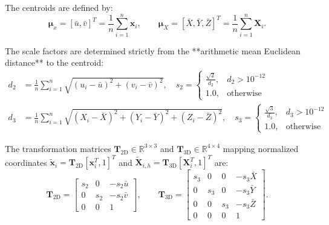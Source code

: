 \documentclass[journal]{IEEEtran}
\begin{document}
The centroids are defined by:
\begin{equation}
\boldsymbol{\mu}_x = [\bar{u}, \bar{v}]^T = \frac{1}{n} \sum_{i=1}^n \mathbf{x}_i, \qquad \boldsymbol{\mu}_X = [\bar{X}, \bar{Y}, \bar{Z}]^T = \frac{1}{n} \sum_{i=1}^n \mathbf{X}_i.
\end{equation}

The scale factors are determined strictly from the **arithmetic mean Euclidean distance** to the centroid:
\begin{align}
d_2 &= \frac{1}{n} \sum_{i=1}^n \sqrt{(u_i - \bar{u})^2 + (v_i - \bar{v})^2}, \quad s_2 = \begin{cases} \frac{\sqrt{2}}{d_2}, & d_2 > 10^{-12} \\ 1.0, & \text{otherwise} \end{cases} \label{eq:s2} \\
d_3 &= \frac{1}{n} \sum_{i=1}^n \sqrt{(X_i - \bar{X})^2 + (Y_i - \bar{Y})^2 + (Z_i - \bar{Z})^2}, \quad s_3 = \begin{cases} \frac{\sqrt{3}}{d_3}, & d_3 > 10^{-12} \\ 1.0, & \text{otherwise} \end{cases} \label{eq:s3}
\end{align}

The transformation matrices $\mathbf{T}_{2\mathrm{D}} \in \mathbb{R}^{3 \times 3}$ and $\mathbf{T}_{3\mathrm{D}} \in \mathbb{R}^{4 \times 4}$ mapping normalized coordinates $\tilde{\mathbf{x}}_i = \mathbf{T}_{2\mathrm{D}} [\mathbf{x}_i^T, 1]^T$ and $\tilde{\mathbf{X}}_{i,h} = \mathbf{T}_{3\mathrm{D}} [\mathbf{X}_i^T, 1]^T$ are:
\begin{equation}
\mathbf{T}_{2\mathrm{D}} = \begin{bmatrix} s_2 & 0 & -s_2 \bar{u} \\ 0 & s_2 & -s_2 \bar{v} \\ 0 & 0 & 1 \end{bmatrix}, \qquad \mathbf{T}_{3\mathrm{D}} = \begin{bmatrix} s_3 & 0 & 0 & -s_3 \bar{X} \\ 0 & s_3 & 0 & -s_3 \bar{Y} \\ 0 & 0 & s_3 & -s_3 \bar{Z} \\ 0 & 0 & 0 & 1 \end{bmatrix}.
\label{eq:norm_matrices}
\end{equation}
\end{document}
